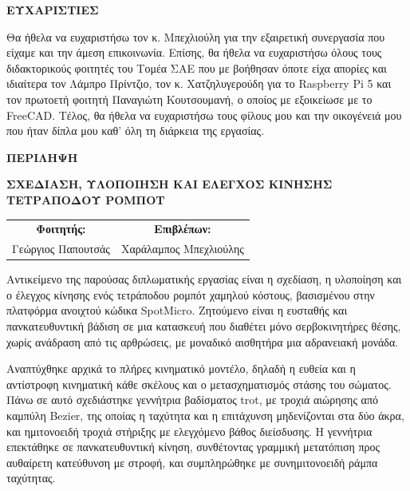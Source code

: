 \documentclass[11pt]{report}
\newcommand\blankpage{%
    \null
    \thispagestyle{empty}
    \addtocounter{page}{-1}
    \newpage}
\begin{document}

\blankpage

\thispagestyle{empty}
\begin{center}
    \textbf{\Large ΕΥΧΑΡΙΣΤΙΕΣ}
\end{center}
\vspace{1em}
Θα ήθελα να ευχαριστήσω τον κ. Μπεχλιούλη για την εξαιρετική συνεργασία που είχαμε και την άμεση επικοινωνία. Επίσης, 
θα ήθελα να ευχαριστήσω όλους τους διδακτορικούς φοιτητές του Τομέα ΣΑΕ που με βοήθησαν όποτε είχα απορίες
 και ιδιαίτερα τον Λάμπρο Πρίντζιο, τον κ. Χατζηλυγερούδη για το Raspberry Pi 5 και 
 τον πρωτοετή φοιτητή Παναγιώτη Κουτσουμανή, ο οποίος με εξοικείωσε με το FreeCAD.
Τέλος, θα ήθελα να ευχαριστήσω τους φίλους μου και την οικογένειά μου
που ήταν δίπλα μου καθ' όλη τη διάρκεια της εργασίας.
\newpage

\thispagestyle{empty}
\noindent\textbf{\Large ΠΕΡΙΛΗΨΗ}

\begin{center}
    \textbf{ΣΧΕΔΙΑΣΗ, ΥΛΟΠΟΙΗΣΗ ΚΑΙ ΕΛΕΓΧΟΣ ΚΙΝΗΣΗΣ ΤΕΤΡΑΠΟΔΟΥ ΡΟΜΠΟΤ}
\end{center}

\begin{center}
\begin{tabular}{cc}
    \textbf{Φοιτητής:} & \textbf{Επιβλέπων:} \\
    Γεώργιος Παπουτσάς & Χαράλαμπος Μπεχλιούλης \\
\end{tabular}
\end{center}

\vspace{1em}
Αντικείμενο της παρούσας διπλωματικής εργασίας είναι η σχεδίαση, η υλοποίηση
και ο έλεγχος κίνησης ενός τετράποδου ρομπότ χαμηλού κόστους, βασισμένου στην
πλατφόρμα ανοιχτού κώδικα SpotMicro. Ζητούμενο είναι η ευσταθής και
πανκατευθυντική βάδιση σε μια κατασκευή που διαθέτει μόνο σερβοκινητήρες θέσης,
χωρίς ανάδραση από τις αρθρώσεις, με μοναδικό αισθητήρα μια αδρανειακή μονάδα.

Αναπτύχθηκε αρχικά το πλήρες κινηματικό μοντέλο, δηλαδή η ευθεία και η
αντίστροφη κινηματική κάθε σκέλους και ο μετασχηματισμός στάσης του σώματος.
Πάνω σε αυτό σχεδιάστηκε γεννήτρια βαδίσματος trot, με τροχιά αιώρησης από
καμπύλη Bezier, της οποίας η ταχύτητα και η επιτάχυνση μηδενίζονται στα δύο
άκρα, και ημιτονοειδή τροχιά στήριξης με ελεγχόμενο βάθος διείσδυσης. Η γεννήτρια επεκτάθηκε σε πανκατευθυντική κίνηση, συνθέτοντας
γραμμική μετατόπιση προς αυθαίρετη κατεύθυνση με στροφή, και συμπληρώθηκε με
συνημιτονοειδή ράμπα ταχύτητας.
\end{document}
